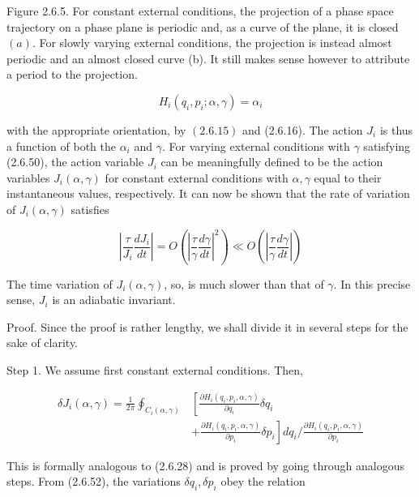 \documentclass{article}
\begin{document}
Figure 2.6.5. For constant external conditions, the projection of a phase space trajectory on a phase plane is periodic and, as a curve of the plane, it is closed $(a)$. For slowly varying external conditions, the projection is instead almost periodic and an almost closed curve (b). It still makes sense however to attribute a period to the projection.
 
\begin{equation*}
H_{i}\left(q_{i}, p_{i} ; \alpha, \gamma\right)=\alpha_{i} \tag{2.6.52}
\end{equation*}
 
with the appropriate orientation, by $(2.6 .15)$ and (2.6.16). The action $J_{i}$ is thus a function of both the $\alpha_{i}$ and $\gamma$. For varying external conditions with $\gamma$ satisfying (2.6.50), the action variable $J_{i}$ can be meaningfully defined to be the action variables $J_{i}(\alpha, \gamma)$ for constant external conditions with $\alpha, \gamma$ equal to their instantaneous values, respectively. It can now be shown that the rate of variation of $J_{i}(\alpha, \gamma)$ satisfies
 
\begin{equation*}
\left|\frac{\tau}{J_{i}} \frac{d J_{i}}{d t}\right|=O\left(\left|\frac{\tau}{\gamma} \frac{d \gamma}{d t}\right|^{2}\right) \ll O\left(\left|\frac{\tau}{\gamma} \frac{d \gamma}{d t}\right|\right) \tag{2.6.53}
\end{equation*}
 

The time variation of $J_{i}(\alpha, \gamma)$, so, is much slower than that of $\gamma$. In this precise sense, $J_{i}$ is an adiabatic invariant.

Proof. Since the proof is rather lengthy, we shall divide it in several steps for the sake of clarity.

Step 1. We assume first constant external conditions. Then,
 
\begin{align*}
\delta J_{i}(\alpha, \gamma)=\frac{1}{2 \pi} \oint_{C_{i}(\alpha, \gamma)} & {\left[\frac{\partial H_{i}\left(q_{i}, p_{i}, \alpha, \gamma\right)}{\partial q_{i}} \delta q_{i}\right.}  \tag{2.6.54}\\
& \left.+\frac{\partial H_{i}\left(q_{i}, p_{i}, \alpha, \gamma\right)}{\partial p_{i}} \delta p_{i}\right] d q_{i} / \frac{\partial H_{i}\left(q_{i}, p_{i}, \alpha, \gamma\right)}{\partial p_{i}}
\end{align*}
 

This is formally analogous to (2.6.28) and is proved by going through analogous steps. From (2.6.52), the variations $\delta q_{i}, \delta p_{i}$ obey the relation
 
\end{document}
